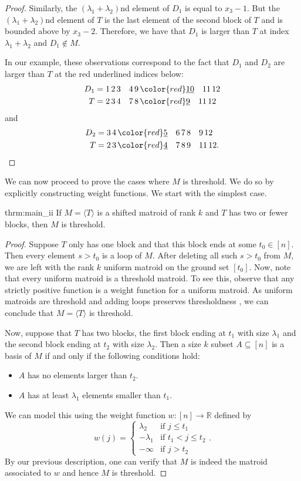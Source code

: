 \documentclass{amsart}
\theoremstyle{definition}
\theoremstyle{plain}
\newcommand{\R}{\mathbb{R}}
\begin{document}
\begin{proof}
Similarly, the $(\lambda_1+\lambda_2)$nd element of $D_1$ is equal to $x_3-1$. But the $(\lambda_1+\lambda_2)$nd element of $T$ is the last element of the second block of $T$ and is bounded above by $x_3-2$. Therefore, we have that $D_1$ is larger than $T$ at index $\lambda_1+\lambda_2$ and $D_1\not\in M$.

In our example, these observations correspond to the fact that $D_1$ and $D_2$ are larger than $T$ at the red underlined indices below:
\begin{align*}
D_1 = 1\, 2\, 3\quad  4\, 9\, &{\color{red}\underline{10}}\quad  11\,12\\
T=2\,3\,4\quad 7\,8\,&{\color{red} \underline 9}\quad 11\,12
\end{align*}
and 
\begin{align*}
D_2 = 3\, 4\, &{\color{red} \underline 5}\quad 6\, 7\,  8\quad 9\, 12\\
T=2\,3\,&{\color{red} \underline 4}\quad 7\,8\,9\quad 11\,12.
\end{align*}
\end{proof}

We can now proceed to prove the cases where $M$ is threshold. We do so by explicitly constructing weight functions. We start with the simplest case.
\begin{reptheorem}{thrm:main_ii}
If $M=\langle T\rangle$ is a shifted matroid of rank $k$ and $T$ has two or fewer blocks, then $M$ is threshold.
\end{reptheorem}
\begin{proof}
Suppose $T$ only has one block and that this block ends at some $t_0\in [n]$. Then every element $s>t_0$ is a loop of $M$. After deleting all such $s>t_0$ from $M$, we are left with the rank $k$ uniform matroid on the ground set $[t_0]$. Now, note that every uniform matroid is a threshold matroid. To see this, observe that any strictly positive function is a weight function for a uniform matroid. As uniform matroids are threshold and adding loops preserves thresholdness \cite[Lemma $5.2$]{DO}, we can conclude that $M=\langle T \rangle$ is threshold.

Now, suppose that $T$ has two blocks, the first block ending at $t_1$ with size $\lambda_1$ and the second block ending at $t_2$ with size $\lambda_2$. Then a size $k$ subset $A\subseteq [n]$ is a basis of $M$ if and only if the following conditions hold:
\begin{itemize}
\item $A$ has no elements larger than $t_2$.
\item $A$ has at least $\lambda_1$ elements smaller than $t_1$.
\end{itemize}
We can model this using the weight function $w:[n]\to \R$ defined by
\[w(j) = \begin{cases}
 \lambda_2 & \text{if $j\leq t_1$}\\
 -\lambda_1 & \text{if $t_1< j \leq t_2$}\\
 -\infty & \text{if $j> t_2$}
\end{cases}. \]
By our previous description, one can verify that $M$ is indeed the matroid associated to $w$ and hence $M$ is threshold.
\end{proof}
\end{document}
